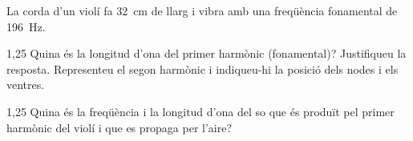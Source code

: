 La corda d'un violí fa 32~cm de llarg i vibra amb una freqüència fonamental de 196~Hz.

\begin{apartat}{1,25}
Quina és la longitud d'ona del primer harmònic (fonamental)? Justifiqueu la resposta. Representeu el segon harmònic i indiqueu-hi la posició dels nodes i els ventres.
\end{apartat}

\begin{apartat}{1,25}
Quina és la freqüència i la longitud d'ona del so que és produït pel primer harmònic del violí i que es propaga per l'aire?
\end{apartat}

